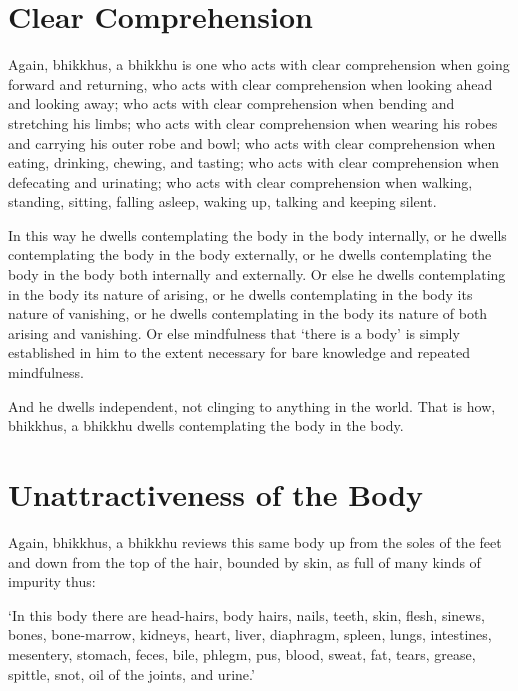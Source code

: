 \englishPage
\section{Clear Comprehension}

Again, bhikkhus, a bhikkhu is one who acts with clear comprehension when going
forward and returning, who acts with clear comprehension when looking ahead and
looking away; who acts with clear comprehension when bending and stretching his
limbs; who acts with clear comprehension when wearing his robes and carrying his
outer robe and bowl; who acts with clear comprehension when eating, drinking,
chewing, and tasting; who acts with clear comprehension when defecating and
urinating; who acts with clear comprehension when walking, standing, sitting,
falling asleep, waking up, talking and keeping silent.

In this way he dwells contemplating the body in the body internally, or he
dwells contemplating the body in the body externally, or he dwells contemplating
the body in the body both internally and externally. Or else he dwells
contemplating in the body its nature of arising, or he dwells contemplating in
the body its nature of vanishing, or he dwells contemplating in the body its
nature of both arising and vanishing. Or else mindfulness that ‘there is a body’
is simply established in him to the extent necessary for bare knowledge and
repeated mindfulness.

And he dwells independent, not clinging to anything in the world. That is how,
bhikkhus, a bhikkhu dwells contemplating the body in the body.


\section{Unattractiveness of the Body}

Again, bhikkhus, a bhikkhu reviews this same body up from the soles of the feet
and down from the top of the hair, bounded by skin, as full of many kinds of
impurity thus:

\enlargethispage{2\baselineskip}

‘In this body there are head-hairs, body hairs, nails, teeth, skin, flesh,
sinews, bones, bone-marrow, kidneys, heart, liver, diaphragm, spleen, lungs,
intestines, mesentery, stomach, feces, bile, phlegm, pus, blood, sweat, fat,
tears, grease, spittle, snot, oil of the joints, and urine.’

